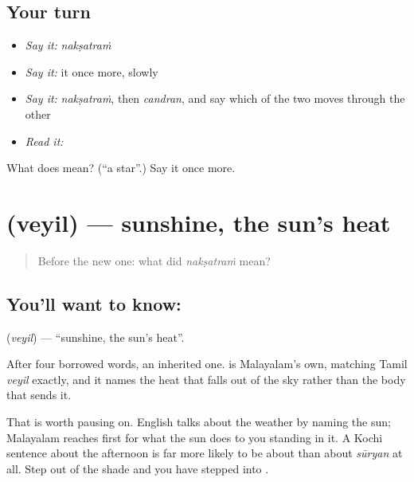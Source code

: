 \subsection*{Your turn}
\begin{itemize}
\raggedright
  \item \emph{Say it:} \emph{nakṣatraṁ}
  \item \emph{Say it:} it once more, slowly
  \item \emph{Say it:} \emph{nakṣatraṁ}, then \emph{candran}, and say which of the two moves through the other
  \item \emph{Read it:} \textbf{}
\end{itemize}

\begin{tcolorbox}[breakable,colback=teal!4,colframe=teal!35!black,title={Before you move on}]
What does  mean? (\textquotedblleft{}a star\textquotedblright{}.) Say it once more.
\end{tcolorbox}
\section[\texorpdfstring{\ml{വെയിൽ} (veyil)}{വെയിൽ (veyil)}]{ (veyil) — sunshine, the sun's heat}

\label{lesson:ML-C53-sunshine}



\begin{quote}
Before the new one: what did \emph{nakṣatraṁ} mean?
\end{quote}

\subsection*{You'll want to know: }
\textbf{} (\emph{veyil}) — \textquotedblleft{}sunshine, the sun's heat\textquotedblright{}.

After four borrowed words, an inherited one.  is Malayalam's own, matching Tamil \emph{veyil} exactly, and it names the heat that falls out of the sky rather than the body that sends it.

That is worth pausing on. English talks about the weather by naming the sun; Malayalam reaches first for what the sun does to you standing in it. A Kochi sentence about the afternoon is far more likely to be about  than about \emph{sūryan} at all. Step out of the shade and you have stepped into .

